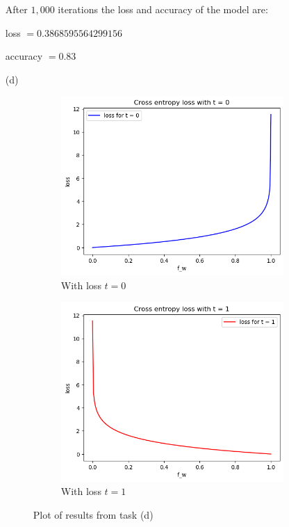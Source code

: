 \documentclass [a4paper, 11pt] {article}
\begin{document}
\begin{enumerate}
\bigskip
\bigskip
\bigskip

After $1,000$ iterations the loss and accuracy of the model are:

	\qquad loss $= 0.3868595564299156$
	
	\qquad accuracy $= 0.83$



	
\item[(d)]
\begin{figure}[!h]
	\centering
	\begin{subfigure}{0.4\textwidth}
		\centering
		\includegraphics[width=\textwidth]{img/2_1_d_1.png}
		\caption{With loss $t = 0$}
		\label{fig:1a}
	\end{subfigure}
	\begin{subfigure}{0.4\textwidth}
		\centering
		\includegraphics[width=\textwidth]{img/2_1_d_2.png}
		\caption{With loss $t = 1$}
		\label{fig:1b}
	\end{subfigure}
	\caption{Plot of results from task (d)}
	\label{fig:1}
\end{figure}

\end{enumerate}
	
\end{document}
